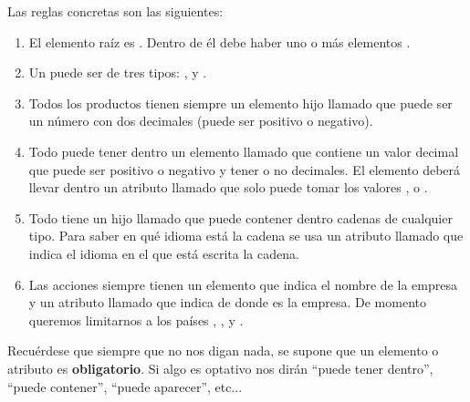 \documentclass[letterpaper,10pt,spanish]{sphinxmanual}
\begin{document}
Las reglas concretas son las siguientes:
\begin{enumerate}
\item {} 
El elemento raíz es . Dentro de él debe haber uno o más elementos .

\item {} 
Un  puede ser de tres tipos: ,  y .

\item {} 
Todos los productos tienen siempre un elemento hijo llamado  que puede ser un número con dos decimales (puede ser positivo o negativo).

\item {} 
Todo  puede tener dentro un elemento llamado  que contiene un valor decimal que puede ser positivo o negativo y tener o no decimales. El elemento  deberá llevar dentro un atributo llamado  que solo puede tomar los valores ,  o .

\item {} 
Todo  tiene un hijo llamado  que puede contener dentro cadenas de cualquier tipo. Para saber en qué idioma está la cadena se usa un atributo llamado  que indica el idioma en el que está escrita la cadena.

\item {} 
Las acciones siempre tienen un elemento  que indica el nombre de la empresa y un atributo llamado  que indica de donde es la empresa. De momento queremos limitarnos a los países , ,  y .

\end{enumerate}

Recuérdese que siempre que no nos digan nada, se supone que un elemento o atributo es \textbf{obligatorio}. Si algo es optativo nos dirán ``puede tener dentro'', ``puede contener'', ``puede aparecer'', etc...
\end{document}
